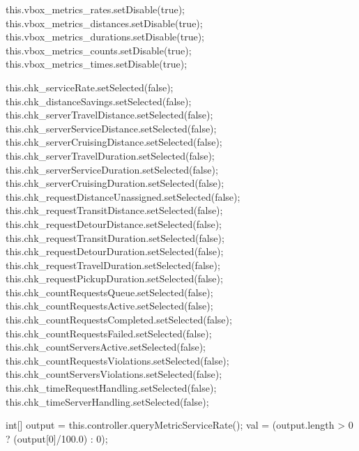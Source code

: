 \nwenddocs{}\endmoddef{}
this.vbox_metrics_rates.setDisable(true);
this.vbox_metrics_distances.setDisable(true);
this.vbox_metrics_durations.setDisable(true);
this.vbox_metrics_counts.setDisable(true);
this.vbox_metrics_times.setDisable(true);
\nwendcode{}\nwdocspar

\nwenddocs{}\endmoddef{}
this.chk_serviceRate.setSelected(false);
this.chk_distanceSavings.setSelected(false);
this.chk_serverTravelDistance.setSelected(false);
this.chk_serverServiceDistance.setSelected(false);
this.chk_serverCruisingDistance.setSelected(false);
this.chk_serverTravelDuration.setSelected(false);
this.chk_serverServiceDuration.setSelected(false);
this.chk_serverCruisingDuration.setSelected(false);
this.chk_requestDistanceUnassigned.setSelected(false);
this.chk_requestTransitDistance.setSelected(false);
this.chk_requestDetourDistance.setSelected(false);
this.chk_requestTransitDuration.setSelected(false);
this.chk_requestDetourDuration.setSelected(false);
this.chk_requestTravelDuration.setSelected(false);
this.chk_requestPickupDuration.setSelected(false);
this.chk_countRequestsQueue.setSelected(false);
this.chk_countRequestsActive.setSelected(false);
this.chk_countRequestsCompleted.setSelected(false);
this.chk_countRequestsFailed.setSelected(false);
this.chk_countServersActive.setSelected(false);
this.chk_countRequestsViolations.setSelected(false);
this.chk_countServersViolations.setSelected(false);
this.chk_timeRequestHandling.setSelected(false);
this.chk_timeServerHandling.setSelected(false);
\nwendcode{}\nwdocspar

\nwenddocs{}\endmoddef{}
int[] output = this.controller.queryMetricServiceRate();
val = (output.length > 0 ? (output[0]/100.0) : 0);
\nwendcode{}\nwdocspar

